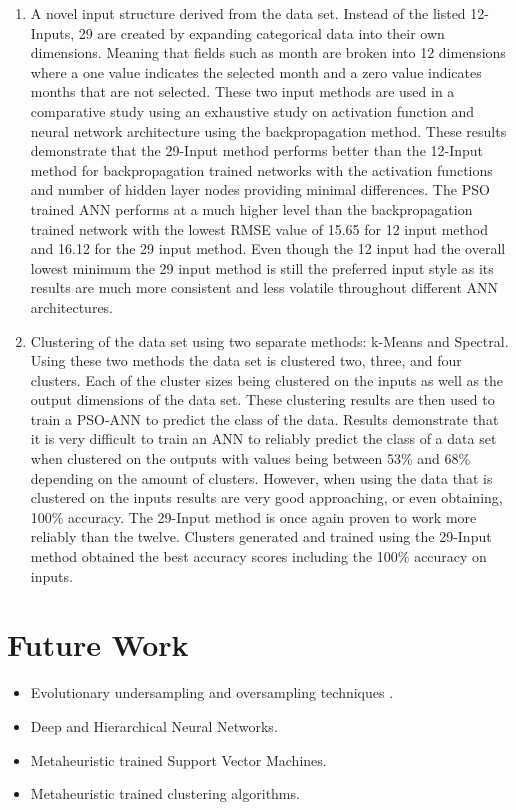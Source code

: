 \begin{enumerate}
    \item A novel input structure derived from the data set. Instead of the listed 12-Inputs, 29 are created by expanding categorical data into their own dimensions. Meaning that fields such as month are broken into 12 dimensions where a one value indicates the selected month and a zero value indicates months that are not selected. These two input methods are used in a comparative study using an exhaustive study on activation function and neural network architecture using the backpropagation method. These results demonstrate that the 29-Input method performs better than the 12-Input method for backpropagation trained networks with the activation functions and number of hidden layer nodes providing minimal differences. The PSO trained ANN performs at a much higher level than the backpropagation trained network with the lowest RMSE value of 15.65 for 12 input method and 16.12 for the 29 input method. Even though the 12 input had the overall lowest minimum the 29 input method is still the preferred input style as its results are much more consistent and less volatile throughout different ANN architectures.

    \item Clustering of the data set using two separate methods: k-Means and Spectral. Using these two methods the data set is clustered two, three, and four clusters. Each of the cluster sizes being clustered on the inputs as well as the output dimensions of the data set. These clustering results are then used to train a PSO-ANN to predict the class of the data. Results demonstrate that it is very difficult to train an ANN to reliably predict the class of a data set when clustered on the outputs with values being between 53\% and 68\% depending on the amount of clusters. However, when using the data that is clustered on the inputs results are very good approaching, or even obtaining, 100\% accuracy. The 29-Input method is once again proven to work more reliably than the twelve. Clusters generated and trained using the 29-Input method obtained the best accuracy scores including the 100\% accuracy on inputs.
\end{enumerate}


\section{Future Work}

\begin{itemize}
    
    \item Evolutionary undersampling and oversampling techniques \cite{Luengo2010}.
    
    \item Deep and Hierarchical Neural Networks.
    
    \item Metaheuristic trained Support Vector Machines.

    \item Metaheuristic trained clustering algorithms.
    
\end{itemize}


